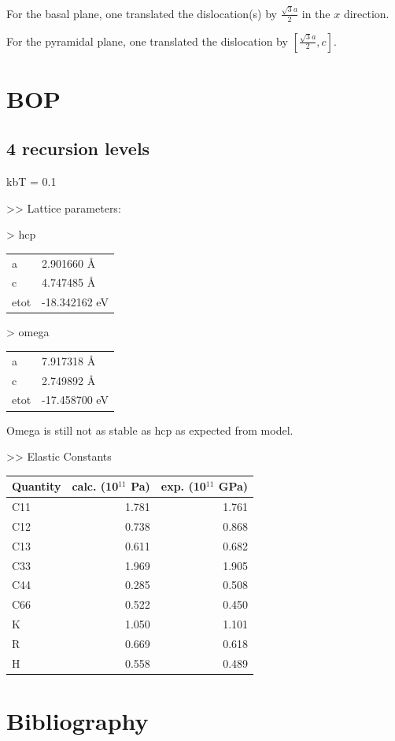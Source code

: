 \documentclass[11pt]{article}
\begin{document}
For the basal plane, one translated the dislocation(s) by
\(\frac{\sqrt{3}a}{2}\) in the \(x\) direction. 

For the pyramidal plane, one translated the dislocation by
\([\frac{\sqrt{3}a}{2}, c]\).




\section{BOP}
\label{sec:orge5dadc4}

\subsection{4 recursion levels}
\label{sec:org9c4384a}

kbT = 0.1

>> Lattice parameters:

> hcp
\begin{center}
\begin{tabular}{ll}
a & 2.901660  \AA{}\\
c & 4.747485  \AA{}\\
etot & -18.342162  eV\\
\end{tabular}
\end{center}

> omega
\begin{center}
\begin{tabular}{ll}
a & 7.917318  \AA{}\\
c & 2.749892 \AA{}\\
etot & -17.458700 eV\\
\end{tabular}
\end{center}

Omega is still not as stable as hcp as expected from model. 


>> Elastic Constants

\begin{center}
\begin{tabular}{lrr}
Quantity & calc. (10\(^{\text{11}}\) Pa) & exp. (10\(^{\text{11}}\) GPa)\\
\hline
C11 & 1.781 & 1.761\\
C12 & 0.738 & 0.868\\
C13 & 0.611 & 0.682\\
C33 & 1.969 & 1.905\\
C44 & 0.285 & 0.508\\
C66 & 0.522 & 0.450\\
K & 1.050 & 1.101\\
R & 0.669 & 0.618\\
H & 0.558 & 0.489\\
\end{tabular}
\end{center}

\section{Bibliography}
\label{sec:org9514e67}
\label{orgef3c548}



\end{document}

